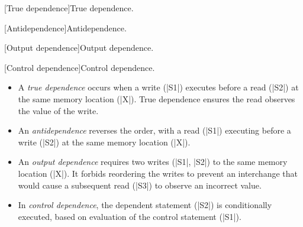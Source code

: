 \begin{center}
\begin{minipage}[t]{.4\textwidth}
[True dependence]{True dependence.}
\label{dep-true}
\end{minipage}\hspace{3em}
\begin{minipage}[t]{.4\textwidth}
[Antidependence]{Antidependence.}
\label{dep-anti}
\end{minipage}

\begin{minipage}[t]{.4\textwidth}
[Output dependence]{Output dependence.}
\label{dep-out}
\end{minipage}\hspace{3em}
\begin{minipage}[t]{.4\textwidth}
[Control dependence]{Control dependence.}
\label{dep-control}
\end{minipage}
\end{center}

\begin{itemize}
\item A \emph{true dependence}
occurs when a write (\pr|S1|) executes before a read (\pr|S2|) at the same memory location (\pr|X|).
True dependence ensures the read observes the value of the write.

\item An \emph{antidependence}
reverses the order,
with a read (\pr|S1|) executing before a write (\pr|S2|) at the same memory location (\pr|X|).

\item An \emph{output dependence}
requires two writes  (\pr|S1|, \pr|S2|) to the same memory location (\pr|X|).
It forbids reordering the writes to prevent an interchange that would cause a subsequent read (\pr|S3|) to observe an incorrect value.

\item In \emph{control dependence}, the dependent statement (\pr|S2|) is conditionally executed,
based on evaluation of the control statement (\pr|S1|).
\end{itemize}

